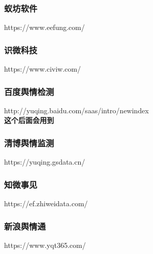 \documentclass[11pt,a4paper,utf8]{article}
\begin{document}
\subsubsection{蚁坊软件}
https://www.eefung.com/ \\  

\subsubsection{识微科技}
https://www.civiw.com/ \\ 

\subsubsection{百度舆情检测}
http://yuqing.baidu.com/saas/intro/newindex \\
\textbf{这个后面会用到}

\subsubsection{清博舆情监测}
https://yuqing.gsdata.cn/

\subsubsection{知微事见}
https://ef.zhiweidata.com/

\subsubsection{新浪舆情通}
https://www.yqt365.com/
 
\end{document}
